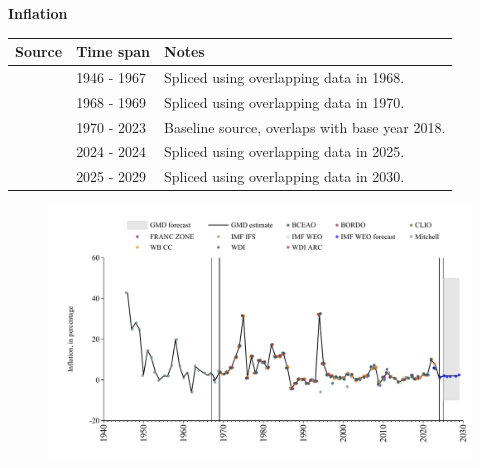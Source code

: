 \documentclass[12pt,a4paper,landscape]{article}
\begin{document}
\begin{adjustbox}{max totalsize={\paperwidth}{\paperheight},center}
\begin{minipage}[t][\textheight][t]{\textwidth}
\vspace*{0.5cm}
{}
\begin{center}
{\Large\bfseries Inflation}
\end{center}
\vspace{0.5cm}
\begin{table}[H]
\centering
\small
\begin{tabular}{|l|l|l|}
\hline
\textbf{Source} & \textbf{Time span} & \textbf{Notes} \\
\hline
\rowcolor{white}\cite{Mitchell}& 1946 - 1967 &Spliced using overlapping data in 1968. \\
\rowcolor{lightgray}\cite{WDI}& 1968 - 1969 &Spliced using overlapping data in 1970. \\
\rowcolor{white}\cite{WB_CC}& 1970 - 2023 &Baseline source, overlaps with base year 2018. \\
\rowcolor{lightgray}\cite{BCEAO}& 2024 - 2024 &Spliced using overlapping data in 2025. \\
\rowcolor{white}\cite{IMF_WEO_forecast}& 2025 - 2029 &Spliced using overlapping data in 2030. \\
\hline
\end{tabular}
\end{table}
\begin{figure}[H]
\centering
\includegraphics[width=\textwidth,height=0.6\textheight,keepaspectratio]{graphs/SEN_infl.pdf}
\end{figure}
\end{minipage}
\end{adjustbox}
\end{document}
